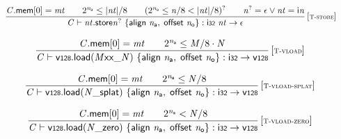 $$
\begin{array}{@{}c@{}}\displaystyle
\frac{
{\mathit{C}}.\mathsf{mem}{}[0] = {\mathit{mt}}
 \qquad
{2^{{\mathit{n}}_{{\mathsf{a}}}}} \leq {|{\mathit{nt}}|} / 8
 \qquad
({2^{{\mathit{n}}_{{\mathsf{a}}}}} \leq {\mathit{n}} / 8 < {|{\mathit{nt}}|} / 8)^?
 \qquad
{{\mathit{n}}^?} = \epsilon \lor {\mathit{nt}} = {\mathsf{i}}{{\mathit{n}}}
}{
{\mathit{C}} \vdash {{\mathit{nt}}.\mathsf{store}}{{{\mathit{n}}^?}}~\{ \begin{array}[t]{@{}l@{}}
\mathsf{align}~{\mathit{n}}_{{\mathsf{a}}},\; \mathsf{offset}~{\mathit{n}}_{{\mathsf{o}}} \}\end{array} : \mathsf{i{\scriptstyle32}}~{\mathit{nt}} \rightarrow \epsilon
} \, {[\textsc{\scriptsize T{-}store}]}
\qquad
\end{array}
$$

$$
\begin{array}{@{}c@{}}\displaystyle
\frac{
{\mathit{C}}.\mathsf{mem}{}[0] = {\mathit{mt}}
 \qquad
{2^{{\mathit{n}}_{{\mathsf{a}}}}} \leq {\mathit{M}} / 8 \cdot {\mathit{N}}
}{
{\mathit{C}} \vdash {\mathsf{v{\scriptstyle128}.load}}{({{{{{\mathit{M}}}{\mathsf{x}}}{\mathsf{x}}}{\mathsf{\_}}}{{\mathit{N}}})}~\{ \begin{array}[t]{@{}l@{}}
\mathsf{align}~{\mathit{n}}_{{\mathsf{a}}},\; \mathsf{offset}~{\mathit{n}}_{{\mathsf{o}}} \}\end{array} : \mathsf{i{\scriptstyle32}} \rightarrow \mathsf{v{\scriptstyle128}}
} \, {[\textsc{\scriptsize T{-}vload}]}
\qquad
\end{array}
$$

$$
\begin{array}{@{}c@{}}\displaystyle
\frac{
{\mathit{C}}.\mathsf{mem}{}[0] = {\mathit{mt}}
 \qquad
{2^{{\mathit{n}}_{{\mathsf{a}}}}} \leq {\mathit{N}} / 8
}{
{\mathit{C}} \vdash {\mathsf{v{\scriptstyle128}.load}}{({{{\mathit{N}}}{\mathsf{\_}}}{\mathsf{splat}})}~\{ \begin{array}[t]{@{}l@{}}
\mathsf{align}~{\mathit{n}}_{{\mathsf{a}}},\; \mathsf{offset}~{\mathit{n}}_{{\mathsf{o}}} \}\end{array} : \mathsf{i{\scriptstyle32}} \rightarrow \mathsf{v{\scriptstyle128}}
} \, {[\textsc{\scriptsize T{-}vload{-}splat}]}
\qquad
\end{array}
$$

$$
\begin{array}{@{}c@{}}\displaystyle
\frac{
{\mathit{C}}.\mathsf{mem}{}[0] = {\mathit{mt}}
 \qquad
{2^{{\mathit{n}}_{{\mathsf{a}}}}} < {\mathit{N}} / 8
}{
{\mathit{C}} \vdash {\mathsf{v{\scriptstyle128}.load}}{({{{\mathit{N}}}{\mathsf{\_}}}{\mathsf{zero}})}~\{ \begin{array}[t]{@{}l@{}}
\mathsf{align}~{\mathit{n}}_{{\mathsf{a}}},\; \mathsf{offset}~{\mathit{n}}_{{\mathsf{o}}} \}\end{array} : \mathsf{i{\scriptstyle32}} \rightarrow \mathsf{v{\scriptstyle128}}
} \, {[\textsc{\scriptsize T{-}vload{-}zero}]}
\qquad
\end{array}
$$

